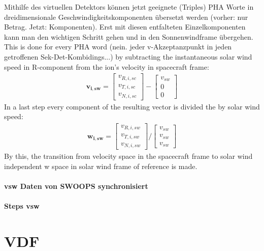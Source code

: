 Mithilfe des virtuellen Detektors können jetzt geeignete (Triples) PHA Worte in dreidimensionale Geschwindigkeitskomponenten übersetzt werden (vorher: nur Betrag. Jetzt: Komponenten).
Erst mit diesen entfalteten Einzelkomponenten kann man den wichtigen Schritt gehen und in den Sonnenwindframe übergehen.
This is done for every PHA word (nein. jeder v-Akzeptanzpunkt in jeden getroffenen Sek-Det-Kombidings...) by subtracting the instantaneous solar wind speed in R-component from the ion's velocity in spacecraft frame: 
\begin{align*}
\mathbf{v_{i,sw}} = \begin{bmatrix}v_{R,i,sc}\\v_{T,i,sc}\\v_{N,i,sc}\end{bmatrix} - \begin{bmatrix}v_{sw}\\0\\0\end{bmatrix}
\end{align*}
In a last step every component of the resulting vector is divided the by solar wind speed:
\begin{align*}
\mathbf{w_{i,sw}} = \begin{bmatrix}v_{R,i,sw}\\v_{T,i,sw}\\v_{N,i,sw}\end{bmatrix} / \begin{bmatrix}v_{sw}\\v_{sw}\\v_{sw}\end{bmatrix}
\end{align*}
By this, the transition from velocity space in the spacecraft frame to solar wind independent w space in solar wind frame of reference is made.
\\ \\
\textbf{vsw Daten von SWOOPS synchronisiert} \\ \\
\textbf{Steps vsw}
%
%
%
\section{VDF}

%
